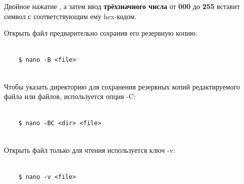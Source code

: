 Двойное нажатие , а затем ввод \textbf{трёхзначного числа} от \textbf{000} до \textbf{255} вставит символ с соответствующим ему hex-кодом.

Открыть файл  предварительно сохранив его резервную копию:
\begin{lstlisting}
	
	$ nano -B <file>
	
\end{lstlisting}	

Чтобы указать директорию для сохранения резервных копий редактируемого файла или файлов, используется опция -C:
\begin{lstlisting}
	
	$ nano -BC <dir> <file>
	
\end{lstlisting}	


Открыть файл  только для чтения используется ключ -v:
\begin{lstlisting}
	
	$ nano -v <file>
	
\end{lstlisting}	
